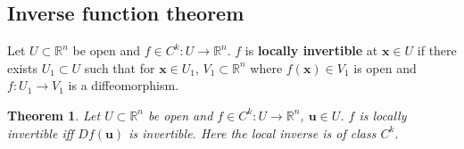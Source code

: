 \documentclass[letter-paper]{tufte-book}
\newtheorem{theorem}{\color{pastel-blue}Theorem}[section]
\begin{document}

\subsection{Inverse function theorem}

Let $U \subset \mathbb{R}^n$ be open and $f \in C^k : U \to \mathbb{R}^n$. $f$
is \textbf{locally invertible} at $\boldsymbol{x} \in U$ if there exists $U_1
\subset U$ such that for $\boldsymbol{x} \in U_1$, $V_1 \subset \mathbb{R}^n$
where $f(\boldsymbol{x}) \in V_1$ is open and $f: U_1 \to V_1$ is a
diffeomorphism.

\begin{theorem}
  Let $U \subset \mathbb{R}^n$ be open and $f \in C^k : U \to \mathbb{R}^n$,
  $\boldsymbol{u} \in U$. $f$ is locally invertible iff $Df(\boldsymbol{u})$ is
  invertible. Here the local inverse is of class $C^k$.
\end{theorem}
\end{document}
